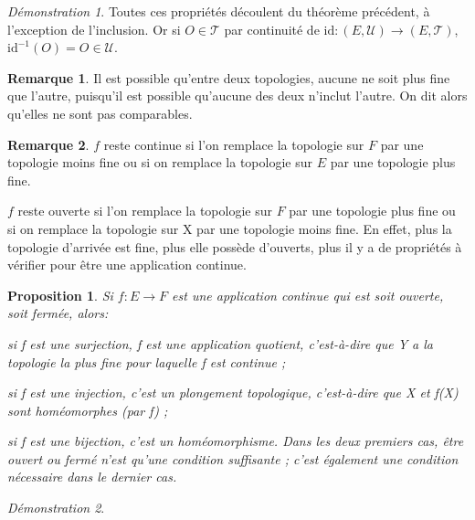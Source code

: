\documentclass[a4paper, 11pt, french]{book}
\newenvironment{itemise}{\itemize}{\enditemize}
\let\colour=\color
\theoremstyle{plain} %
\newtheorem{proposition}{Proposition}
\theoremstyle{definition} %
\newtheorem{remarque}{Remarque}
\theoremstyle{remark} %
\newtheorem*{demonstration}{Démonstration}
\newcommand{\1}{\mathds{1}}
\newcommand{\id}{\mathrm{id}}
\newcommand{\inv}[1]{#1^{-1}}
\newcommand{\scr}[1]{\mathscr{#1}}
\begin{document}
\begin{demonstration}
	Toutes ces propriétés découlent du théorème précédent, à l'exception de l'inclusion.
	Or si $O\in\scr{T}$ par continuité de $\id\colon(E, \scr{U})\rightarrow(E, \scr{T})$, $\inv{\id}(O)=O\in\scr{U}$.
\end{demonstration}

\begin{remarque}
	Il est possible qu'entre deux topologies, aucune ne soit plus fine que l'autre, puisqu'il est possible qu'aucune des deux n'inclut l'autre.
	On dit alors qu'elles ne sont pas comparables.
\end{remarque}

\begin{remarque} 
	\text{}
	\begin{itemise}
		\item $f$ reste continue si l'on remplace la topologie sur $F$ par une topologie moins fine ou si on remplace la topologie sur $E$ par une topologie plus fine.
		\item $f$ reste ouverte si l'on remplace la topologie sur $F$ par une topologie plus fine ou si on remplace la topologie sur X par une topologie moins fine.
	\end{itemise}
	En effet, plus la topologie d'arrivée est fine, plus elle possède d'ouverts, plus il y a de propriétés à vérifier pour être une application continue.
\end{remarque}

\begin{proposition}
	Si $f\colon E\rightarrow F$ est une application continue qui est soit ouverte, soit fermée, alors:
	\begin{itemise}
		\item si f est une surjection, f est une application quotient, c'est-à-dire que Y a la topologie la plus fine pour laquelle f est continue ;
		\item si f est une injection, c'est un plongement topologique, c'est-à-dire que X et f(X) sont homéomorphes (par f) ;
		\item si f est une bijection, c'est un homéomorphisme.
	\end{itemise}
	Dans les deux premiers cas, être ouvert ou fermé n'est qu'une condition suffisante ; c'est également une condition nécessaire dans le dernier cas.
\end{proposition}

\begin{demonstration}
	\colour{red}{???}
\end{demonstration}
\end{document}
